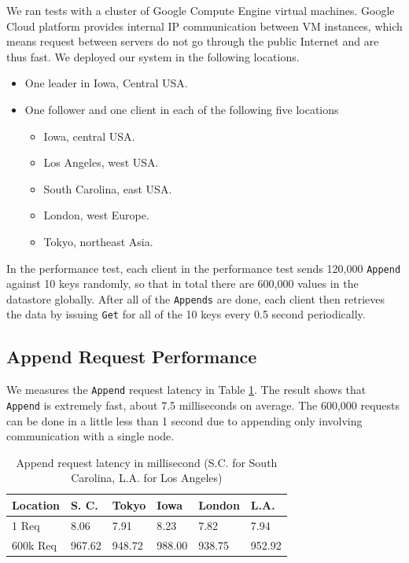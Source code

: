 \documentclass[11pt,english,twocolumn]{article}
\begin{document}
We ran tests with a cluster of Google Compute Engine virtual machines. Google
Cloud platform provides internal IP communication between VM instances, which
means request between servers do not go through the public Internet and are thus
fast. We deployed our system in the following locations.
\begin{itemize}
    \vspace{-0.4cm}
	\item One leader in Iowa, Central USA.
	\vspace{-0.4cm}
	\item One follower and one client in each of the following five locations
\vspace{-0.3cm}
    \begin{itemize}
    \item Iowa, central USA.
\vspace{-0.3cm}
	\item Los Angeles, west USA.
\vspace{-0.3cm}
	\item South Carolina, east USA.
\vspace{-0.3cm}
    \item London, west Europe.
\vspace{-0.3cm}
    \item Tokyo, northeast Asia.
\vspace{-0.3cm}
    \end{itemize}
\end{itemize}

In the performance test, each client in the performance test sends 120,000
\texttt{Append} against 10 keys randomly, so that in total there are
600,000 values in the datastore globally. After all of the \texttt{Appends} are
done, each client then retrieves the data by issuing \texttt{Get} for all of the
10 keys every 0.5 second periodically.

\subsection{Append Request Performance} We measures the \texttt{Append} request
latency in Table \ref{AppendLatency}.  The result shows that \texttt{Append} is
extremely fast, about 7.5 milliseconds on average. The 600,000 requests can be
done in a little less than 1 second due to appending only involving
communication with a single node.

\begin{table}[h]
\small
\centering 
\begin{tabular}{ |p{1.6cm}|p{1cm}|p{0.8cm}|p{0.8cm}|p{1cm}|p{0.8cm}|  }
\hline
Location & S. C. & Tokyo & Iowa & London & L.A. \\
 \hline
 1 Req   & 8.06 & 7.91 & 8.23 & 7.82 & 7.94\\
\hline
600k Req & 967.62 & 948.72 & 988.00 & 938.75 & 952.92\\
 \hline
\end{tabular}
\caption{Append request latency in millisecond (S.C. for South Carolina, L.A. for Los Angeles)}
\label{AppendLatency}
\end{table}
\end{document}

